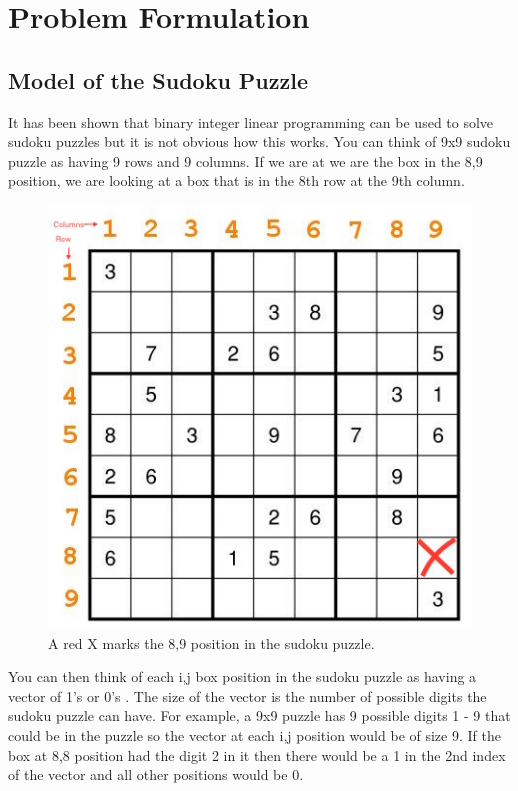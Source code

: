 \documentclass[12pt]{article}
\begin{document}
\section{Problem Formulation}
\subsection{Model of the Sudoku Puzzle}
It has been shown that binary integer linear programming can be used to solve sudoku puzzles but it is not obvious how this works.  You can think of 9x9 sudoku puzzle as having 9 rows and 9 columns.  If we are at we are the box in the 8,9 position, we are looking at a box that is in the 8th row at the 9th column.
\begin{figure}[H]
\centering
\includegraphics[scale=.4]{sudoku_rows_columns.jpg}
\caption{A red X marks the 8,9 position in the sudoku puzzle.}
\end{figure}
You can then think of each i,j box position in the sudoku puzzle as having a vector of 1's or 0's \cite{sudoku4}.  The size of the vector is the number of possible digits the sudoku puzzle can have.  For example, a 9x9 puzzle has 9 possible digits 1 - 9 that could be in the puzzle so the vector at each i,j position would be of size 9. If the box at 8,8 position had the digit 2 in it then there would be a 1 in the 2nd index of the vector and all other positions would be 0.
\end{document}
